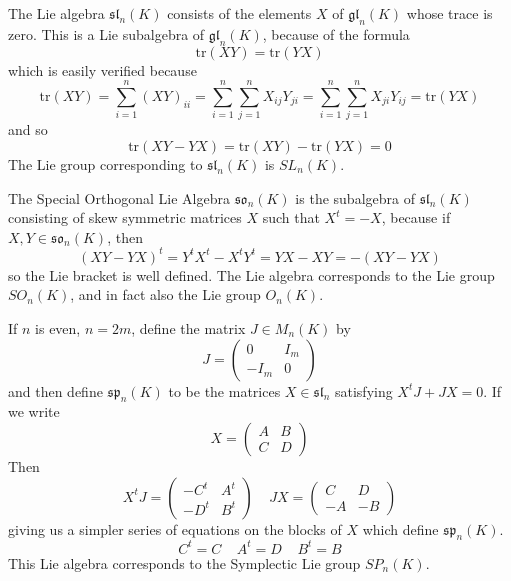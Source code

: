 \begin{example}
    The Lie algebra $\mathfrak{sl}_n(K)$ consists of the elements $X$ of $\mathfrak{gl}_n(K)$ whose trace is zero. This is a Lie subalgebra of $\mathfrak{gl}_n(K)$, because of the formula
    \[ \text{tr}(XY) = \text{tr}(YX) \]
    which is easily verified because
    \[ \text{tr}(XY) = \sum_{i = 1}^n (XY)_{ii} = \sum_{i = 1}^n \sum_{j = 1}^n X_{ij} Y_{ji} = \sum_{i = 1}^n \sum_{j = 1}^n X_{ji} Y_{ij} = \text{tr}(YX) \]
    and so
    \[ \text{tr}(XY - YX) = \text{tr}(XY) - \text{tr}(YX) = 0 \]
    The Lie group corresponding to $\mathfrak{sl}_n(K)$ is $SL_n(K)$.
\end{example}

\begin{example}
    The Special Orthogonal Lie Algebra $\mathfrak{so}_n(K)$ is the subalgebra of $\mathfrak{sl}_n(K)$ consisting of skew symmetric matrices $X$ such that $X^t = -X$, because if $X,Y \in \mathfrak{so}_n(K)$, then
    \[ (XY - YX)^t = Y^tX^t - X^tY^t = YX - XY = -(XY - YX) \]
    so the Lie bracket is well defined. The Lie algebra corresponds to the Lie group $SO_n(K)$, and in fact also the Lie group $O_n(K)$.
\end{example}

\begin{example}
    If $n$ is even, $n = 2m$, define the matrix $J \in M_n(K)$ by
    \[ J = \begin{pmatrix} 0 & I_m \\ -I_m & 0 \end{pmatrix} \]
    and then define $\mathfrak{sp}_n(K)$ to be the matrices $X \in \mathfrak{sl}_n$ satisfying $X^tJ + JX = 0$. If we write
    \[ X = \begin{pmatrix} A & B \\ C & D \end{pmatrix} \]
    Then
    \[ X^tJ = \begin{pmatrix} -C^t & A^t \\ -D^t & B^t \end{pmatrix}\ \ \ \ \ JX = \begin{pmatrix} C & D \\ -A & -B \end{pmatrix} \]
    giving us a simpler series of equations on the blocks of $X$ which define $\mathfrak{sp}_n(K)$.
    \[ C^t = C\ \ \ \ \ A^t = D\ \ \ \ \ B^t = B \]
    This Lie algebra corresponds to the Symplectic Lie group $SP_n(K)$.
\end{example}

